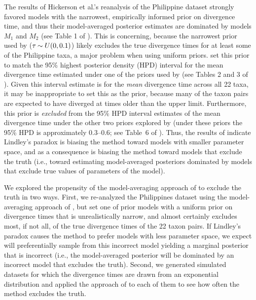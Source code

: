 \documentclass[letterpaper,12pt]{article}
\begin{document}
\begin{linenumbers}
The results of Hickerson et al.'s \citeyear{Hickerson2013} reanalysis of the
Philippine dataset strongly favored models with the narrowest, empirically
informed prior on divergence time, and thus their model-averaged posterior
estimates are dominated by models $M_1$ and $M_2$ (see Table 1 of
\citet{Hickerson2013}).
This is concerning, because the narrowest \divt{} prior used by
\citet{Hickerson2013} ($\tau_{} \sim U(0,0.1)$) likely excludes the true
divergence times for at least some of the Philippine taxa, a major problem when
using uniform priors.
\citet{Hickerson2013} set this prior to match the 95\% highest posterior
density (HPD) interval for the mean divergence time estimated under one of the
priors used by \citet{Oaks2012} (see Tables 2 and 3 of \citet{Oaks2012}).
Given this interval estimate is for the \emph{mean} divergence time across all
22 taxa, it may be inappropriate to set this as the prior, because many of the
taxon pairs are expected to have diverged at times older than the upper limit.
Furthermore, this prior is \emph{excluded} from the 95\% HPD interval estimates
of the mean divergence time under the other two priors explored by
\citet{Oaks2012} (under these priors the 95\% HPD is approximately 0.3--0.6;
see Table~6 of \citet{Oaks2012}).
Thus, the results of \citet{Hickerson2013} indicate Lindley's paradox is
biasing the method toward models with smaller parameter space, and as a
consequence is biasing the method toward models that exclude the truth (i.e.,
toward estimating model-averaged posteriors dominated by models that exclude
true values of parameters of the model).


We explored the propensity of the model-averaging approach of
\citet{Hickerson2013} to exclude the truth in two ways.
First, we re-analyzed the Philippines dataset using the model-averaging approach
of \citet{Hickerson2013}, but set one of prior models with a uniform prior on
divergence times that is unrealistically narrow, and almost certainly excludes
most, if not all, of the true divergence times of the 22 taxon pairs.
If Lindley's paradox causes the method to prefer models with less parameter
space, we expect \msb will preferentially sample from this incorrect model
yielding a marginal posterior that is incorrect (i.e., the model-averaged
posterior will be dominated by an incorrect model that excludes the truth).
Second, we generated simulated datasets for which the divergence times are
drawn from an exponential distribution and applied the approach of
\citet{Hickerson2013} to each of them to see how often the method excludes the
truth.


\end{linenumbers}
\end{document}
